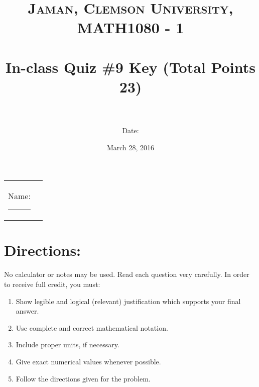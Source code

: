 \documentclass[paper=a4, fontsize=11pt]{scrartcl} %
\title{	
\normalfont \normalsize 
\textsc{Jaman, Clemson University, MATH1080 - 1} \\ [25pt] %
\horrule{0.5pt} \\[0.4cm] %
\huge In-class Quiz \#9 Key (Total Points 23) \\ %
\horrule{2pt} \\[0.5cm] %
}
\author{Date:} %
\date{\normalsize March 28, 2016} %
\numberwithin{equation}{section} %
\numberwithin{figure}{section} %
\numberwithin{table}{section} %
\begin{document}
\maketitle %

\begin{flushleft}
\begin{tabular}{l l}
Name: \rule{3.2in}{.01cm}  & {}%
\end{tabular}
\end{flushleft}


\section*{\textbf{Directions:}}

No calculator or notes may be used.  Read each question very carefully.  In order to receive full credit, you must:
\begin{enumerate}
\item Show legible and logical (relevant) justification which supports your final answer.
\item Use complete and correct mathematical notation.
\item Include proper units, if necessary.
\item Give exact numerical values whenever possible.
\item Follow the directions given for the problem.
\end{enumerate}
\vspace{.1in}

\newpage
\end{document}

